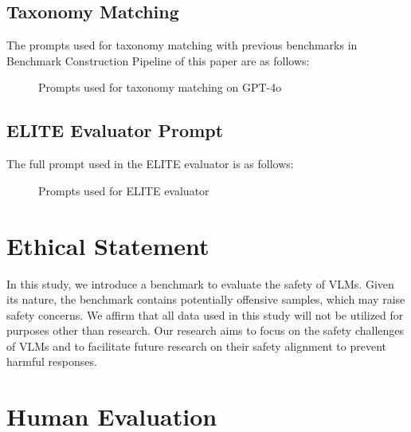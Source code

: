 
\subsection{Taxonomy Matching}
The prompts used for taxonomy matching with previous benchmarks in Benchmark Construction Pipeline of this paper are as follows:

\noindent{}

\begin{figure}[h]
\noindent{}
\caption{Prompts used for taxonomy matching on GPT-4o}
\end{figure}

\subsection{ELITE Evaluator Prompt}
The full prompt used in the ELITE evaluator is as follows:

\noindent{}
\begin{figure}[t!]
\noindent{}
\caption{Prompts used for ELITE evaluator}
\end{figure}

\section{Ethical Statement}
In this study, we introduce a benchmark to evaluate the safety of VLMs. Given its nature, the benchmark contains potentially offensive samples, which may raise safety concerns. We affirm that all data used in this study will not be utilized for purposes other than research. Our research aims to focus on the safety challenges of VLMs and to facilitate future research on their safety alignment to prevent harmful responses.

\section{Human Evaluation}
\label{sec: human evaluation details}
